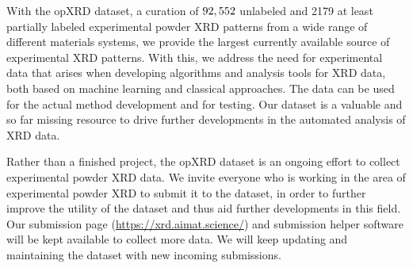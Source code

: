With the opXRD dataset, a curation of $92,552$ unlabeled and 2179 at least partially labeled experimental powder XRD patterns from a wide range of different materials systems, we provide the largest currently available source of experimental XRD patterns. With this, we address the need for experimental data that arises when developing algorithms and analysis tools for XRD data, both based on machine learning and classical approaches. The data can be used for the actual method development and for testing. Our dataset is a valuable and so far missing resource to drive further developments in the automated analysis of XRD data.

Rather than a finished project, the opXRD dataset is an ongoing effort to collect experimental powder XRD data. We invite everyone who is working in the area of experimental powder XRD to submit it to the dataset, in order to further improve the utility of the dataset and thus aid further developments in this field. Our submission page (\url{https://xrd.aimat.science/}) and submission helper software will be kept available to collect more data. We will keep updating and maintaining the dataset with new incoming submissions.
